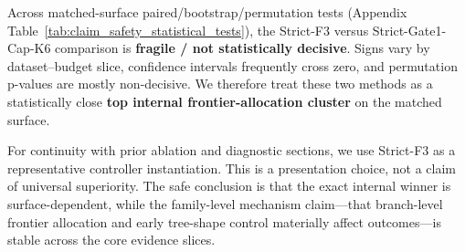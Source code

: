 Across matched-surface paired/bootstrap/permutation tests (Appendix Table~\ref{tab:claim_safety_statistical_tests}), the Strict-F3 versus Strict-Gate1-Cap-K6 comparison is \textbf{fragile / not statistically decisive}. Signs vary by dataset--budget slice, confidence intervals frequently cross zero, and permutation p-values are mostly non-decisive. We therefore treat these two methods as a statistically close \textbf{top internal frontier-allocation cluster} on the matched surface.

For continuity with prior ablation and diagnostic sections, we use Strict-F3 as a representative controller instantiation. This is a presentation choice, not a claim of universal superiority. The safe conclusion is that the exact internal winner is surface-dependent, while the family-level mechanism claim---that branch-level frontier allocation and early tree-shape control materially affect outcomes---is stable across the core evidence slices.

